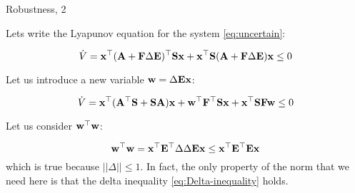 \documentclass{beamer}
\begin{document}
	\begin{frame}{Robustness, 2}
		\begin{flushleft}
			
			Lets write the Lyapunov equation for the system \eqref{eq:uncertain}:
			
			\begin{equation}
				\dot V = \mathbf{x}^\top 
				(\mathbf{A} + \mathbf{F} \Delta \mathbf{E})^\top\mathbf{S}\mathbf{x} + \mathbf{x}^\top\mathbf{S} (\mathbf{A} + \mathbf{F} \Delta \mathbf{E}) \mathbf{x} \leq 0
			\end{equation}
			
			Let us introduce a new variable $\mathbf{w} = \Delta \mathbf{E}\mathbf{x}$:
			
			\begin{equation}
				\label{eq:Lyapunov_xw}
				\dot V = \mathbf{x}^\top 
				(\mathbf{A}^\top \mathbf{S} + \mathbf{S}\mathbf{A}) \mathbf{x} + 
				\mathbf{w}^\top \mathbf{F}^\top\mathbf{S} \mathbf{x} +
				\mathbf{x}^\top \mathbf{S}\mathbf{F} \mathbf{w} \leq 0
			\end{equation}
			
			Let us consider $\mathbf{w}^\top \mathbf{w}$:
			
			\begin{equation}
				\label{eq:Delta-inequality}
				\mathbf{w}^\top \mathbf{w} = 
				\mathbf{x}^\top\mathbf{E}^\top \Delta \Delta \mathbf{E}\mathbf{x}
				\leq
				\mathbf{x}^\top\mathbf{E}^\top \mathbf{E}\mathbf{x}
			\end{equation}		
			which is true because $|| \Delta ||\leq 1$. In fact, the only property of the norm that we need here is that the delta inequality \eqref{eq:Delta-inequality} holds.
			
		\end{flushleft}
	\end{frame}
	
	
	
\end{document}
